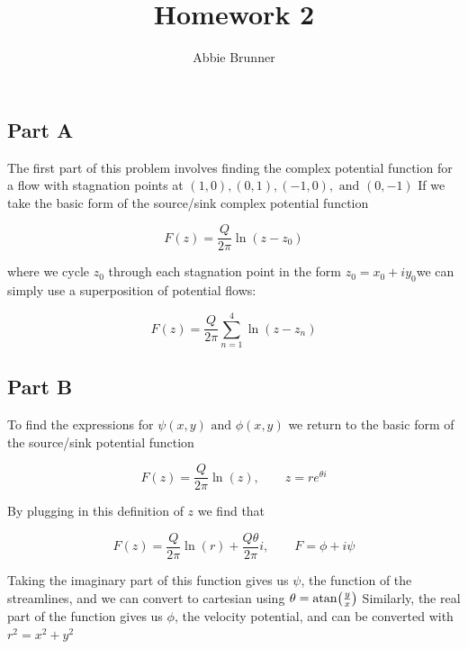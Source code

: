 \documentclass{report}
\title{Homework 2}
\author{Abbie Brunner}
\begin{document}
\maketitle

\tableofcontents

\chapter{}

\section{Part A}

The first part of this problem involves finding the complex potential function for a flow with stagnation points at $(1, 0), (0, 1), (-1, 0),\text{ and }(0, -1)$
If we take the basic form of the source/sink complex potential function

\begin{equation}
   F(z) = \frac{Q}{2\pi}\ln(z-z_0)
   \label{sink}
\end{equation}

where we cycle $z_0$ through each stagnation point in the form $z_0 = x_0 + iy_0$we can simply use a superposition of potential flows:

\begin{equation}
   F(z) = \frac{Q}{2\pi}\sum_{n = 1}^{4} \ln(z-z_n)
   \label{complexp1}
\end{equation}

\section{Part B}

To find the expressions for $\psi(x, y) \text{ and } \phi(x, y)$ we return to the basic form of the source/sink potential function

\begin{equation}
   F(z) = \frac{Q}{2\pi}\ln(z), \qquad z = re^{\theta i}
   \label{basic}
\end{equation}

By plugging in this definition of $z$ we find that

\begin{equation}
   F(z) = \frac{Q}{2\pi}\ln(r)+\frac{Q\theta}{2\pi}i, \qquad F = \phi + i\psi
   \label{polarcomp}
\end{equation}

Taking the imaginary part of this function gives us $\psi$, the function of the streamlines, and we can convert to cartesian using $\theta = \atan(\frac{y}{x})$
Similarly, the real part of the function gives us $\phi$, the velocity potential, and can be converted with $r^2 = x^2+y^2$
\end{document}
